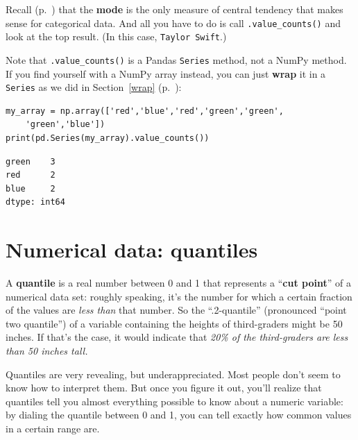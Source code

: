 
Recall (p.~\pageref{mode}) that the \textbf{mode} is the only measure of
central tendency that makes sense for categorical data. And all you have to do
is call \texttt{.value\_counts()} and look at the top result. (In this case,
\texttt{Taylor Swift}.)

Note that \texttt{.value\_counts()} is a Pandas \texttt{Series} method, not a
NumPy method. If you find yourself with a NumPy array instead, you can just
\textbf{wrap} it in a \texttt{Series} as we did in Section~\ref{wrap}
(p.~\pageref{wrap}):

\begin{Verbatim}[fontsize=\small,samepage=true,frame=single,framesep=3mm]
my_array = np.array(['red','blue','red','green','green',
    'green','blue'])
print(pd.Series(my_array).value_counts())
\end{Verbatim}

\begin{Verbatim}[fontsize=\small,samepage=true,frame=leftline,framesep=5mm,framerule=1mm]
green    3
red      2
blue     2
dtype: int64
\end{Verbatim}

\section{Numerical data: quantiles}

\label{quantiles}

A \textbf{quantile} is a real number between 0 and 1 that represents a
``\textbf{cut point}'' of a numerical data set: roughly speaking, it's the
number for which a certain fraction of the values are \textit{less than} that
number. So the ``.2-quantile'' (pronounced ``point two quantile'') of a
variable containing the heights of third-graders might be 50 inches. If that's
the case, it would indicate that \textit{20\% of the third-graders are less
than 50 inches tall.}

Quantiles are very revealing, but underappreciated. Most people don't seem to
know how to interpret them. But once you figure it out, you'll realize that
quantiles tell you almost everything possible to know about a numeric variable:
by dialing the quantile between 0 and 1, you can tell exactly how common values
in a certain range are.


